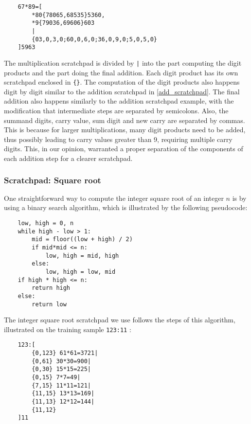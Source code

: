 \begin{lstlisting}
    67*89=[
        *80{78065,68535}5360,
        *9{79036,69606}603
        |
        {03,0,3,0;60,0,6,0;36,0,9,0;5,0,5,0}
    ]5963
\end{lstlisting}

\noindent
The multiplication scratchpad is divided by \verb!|! into the part computing the digit products and the part doing the final addition.
Each digit product has its own scratchpad enclosed in \verb!{}!.
The computation of the digit products also happens digit by digit similar to the addition scratchpad in \cref{add_scratchpad}.
The final addition also happens similarly to the addition scratchpad example, with the modification that intermediate steps are separated by semicolons. Also, the summand digits, carry value, sum digit and new carry are separated by commas. This is because for larger multiplications, many digit products need to be added, thus possibly leading to carry values greater than 9, requiring multiple carry digits. This, in our opinion, warranted a proper separation of the components of each addition step for a clearer scratchpad.

\subsubsection{Scratchpad: Square root}
\label{sqrt_scratchpad}

One straightforward way to compute the integer square root of an integer $n$ is by using a binary search algorithm, which is illustrated by the following pseudocode:

\begin{lstlisting}
    low, high = 0, n
    while high - low > 1:
        mid = floor((low + high) / 2)
        if mid*mid <= n:
            low, high = mid, high
        else:
            low, high = low, mid 
    if high * high <= n:
        return high
    else:
        return low
\end{lstlisting}

\noindent
The integer square root scratchpad we use follows the steps of this algorithm, illustrated on the training sample \verb|123:11| :

\begin{lstlisting}
    123:[
        {0,123} 61*61=3721|
        {0,61} 30*30=900|
        {0,30} 15*15=225|
        {0,15} 7*7=49|
        {7,15} 11*11=121|
        {11,15} 13*13=169|
        {11,13} 12*12=144|
        {11,12}
    ]11
\end{lstlisting}

